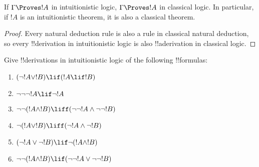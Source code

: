 \documentclass[../../../include/open-logic-section]{subfiles}
\begin{document}
\begin{prop}
  If $\Gamma \Proves !A$ in intuitionistic logic, $\Gamma \Proves !A$ in
  classical logic. In particular, if $!A$ is an intuitionistic
  theorem, it is also a classical theorem.
\end{prop}

\begin{proof}
  Every natural deduction rule is also a rule in classical natural
  deduction, so every !!{derivation} in intuitionistic logic is also
  !!a{derivation} in classical logic.
\end{proof}

\begin{prob}
  Give !!{derivation}s in intuitionistic logic of the following !!{formulas}:
  \begin{enumerate}
    \item $(\lnot !A \lor !B) \lif (!A \lif !B)$
    \item $\lnot\lnot\lnot !A \lif \lnot !A$
    \item $\lnot\lnot (!A \land !B) \liff (\lnot\lnot !A\land \lnot \lnot !B)$
    \item $\lnot (!A \lor !B) \liff (\lnot !A \land \lnot !B)$
    \item $(\lnot !A \lor \lnot !B) \lif \lnot (!A \land !B)$
    \item $\lnot\lnot ( !A \land !B) \lif  (\lnot\lnot !A \lor
    \lnot\lnot !B)$
  \end{enumerate}
\end{prob}
\end{document}
